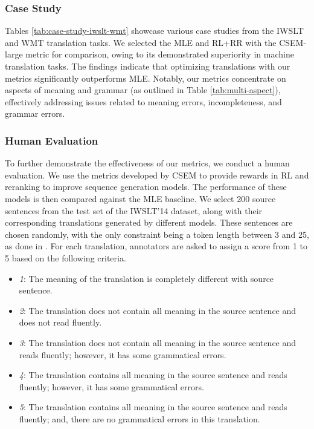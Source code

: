 \documentclass[lettersize,journal]{IEEEtran}
\begin{document}


\subsubsection{Case Study}
Tables \ref{tab:case-study-iwslt-wmt} showcase various case studies from the IWSLT and WMT translation tasks. We selected the MLE and RL+RR with the CSEM-large metric for comparison, owing to its demonstrated superiority in machine translation tasks. The findings indicate that optimizing translations with our metrics significantly outperforms MLE. Notably, our metrics concentrate on aspects of meaning and grammar (as outlined in Table \ref{tab:multi-aspect}), effectively addressing issues related to meaning errors, incompleteness, and grammar errors.

\subsubsection{Human Evaluation} \label{sec:human_evaluation}
To further demonstrate the effectiveness of our metrics, we conduct a human evaluation. We use the metrics developed by CSEM to provide rewards in RL and reranking to improve sequence generation models. The performance of these models is then compared against the MLE baseline. We select 200 source sentences from the test set of the IWSLT'14 dataset, along with their corresponding translations generated by different models. These sentences are chosen randomly, with the only constraint being a token length between 3 and 25, as done in \cite{fernandes2022quality}. For each translation, annotators are asked to assign a score from 1 to 5 based on the following criteria.
\begin{itemize}
    \item \textit{1}: The meaning of the translation is completely different with source sentence.
    \item \textit{2}: The translation does not contain all meaning in the source sentence and does not read fluently.
    \item \textit{3}: The translation does not contain all meaning in the source sentence and reads fluently; however, it has some grammatical errors.
    \item \textit{4}: The translation contains all meaning in the source sentence and reads fluently; however, it has some grammatical errors.
    \item \textit{5}: The translation contains all meaning in the source sentence and reads fluently; and, there are no grammatical errors in this translation.
\end{itemize}
\end{document}
